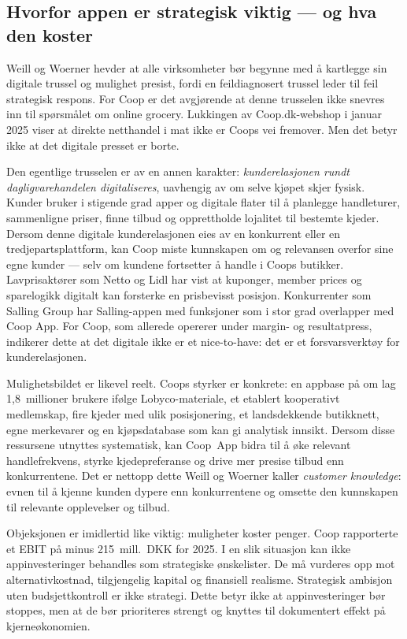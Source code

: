 \documentclass[12pt,a4paper]{article}
\begin{document}
\subsection{Hvorfor appen er strategisk viktig --- og hva den koster}

Weill og Woerner hevder at alle virksomheter bør begynne med å kartlegge sin digitale trussel og mulighet presist, fordi en feildiagnosert trussel leder til feil strategisk respons. For Coop er det avgjørende at denne trusselen ikke snevres inn til spørsmålet om online grocery. Lukkingen av Coop.dk-webshop i januar 2025 viser at direkte netthandel i mat ikke er Coops vei fremover. Men det betyr ikke at det digitale presset er borte.

Den egentlige trusselen er av en annen karakter: \textit{kunderelasjonen rundt dagligvarehandelen digitaliseres}, uavhengig av om selve kjøpet skjer fysisk. Kunder bruker i stigende grad apper og digitale flater til å planlegge handleturer, sammenligne priser, finne tilbud og opprettholde lojalitet til bestemte kjeder. Dersom denne digitale kunderelasjonen eies av en konkurrent eller en tredjepartsplattform, kan Coop miste kunnskapen om og relevansen overfor sine egne kunder --- selv om kundene fortsetter å handle i Coops butikker. Lavprisaktører som Netto og Lidl har vist at kuponger, member prices og sparelogikk digitalt kan forsterke en prisbevisst posisjon. Konkurrenter som Salling Group har Salling-appen med funksjoner som i stor grad overlapper med Coop App. For Coop, som allerede opererer under margin- og resultatpress, indikerer dette at det digitale ikke er et nice-to-have: det er et forsvarsverktøy for kunderelasjonen.

Mulighetsbildet er likevel reelt. Coops styrker er konkrete: en appbase på om lag 1,8~millioner brukere ifølge Lobyco-materiale, et etablert kooperativt medlemskap, fire kjeder med ulik posisjonering, et landsdekkende butikknett, egne merkevarer og en kjøpsdatabase som kan gi analytisk innsikt. Dersom disse ressursene utnyttes systematisk, kan Coop~App bidra til å øke relevant handlefrekvens, styrke kjedepreferanse og drive mer presise tilbud enn konkurrentene. Det er nettopp dette Weill og Woerner kaller \textit{customer knowledge}: evnen til å kjenne kunden dypere enn konkurrentene og omsette den kunnskapen til relevante opplevelser og tilbud.

Objeksjonen er imidlertid like viktig: muligheter koster penger. Coop rapporterte et EBIT på minus 215~mill.~DKK for 2025. I en slik situasjon kan ikke appinvesteringer behandles som strategiske ønskelister. De må vurderes opp mot alternativkostnad, tilgjengelig kapital og finansiell realisme. Strategisk ambisjon uten budsjettkontroll er ikke strategi. Dette betyr ikke at appinvesteringer bør stoppes, men at de bør prioriteres strengt og knyttes til dokumentert effekt på kjerneøkonomien.
\end{document}
